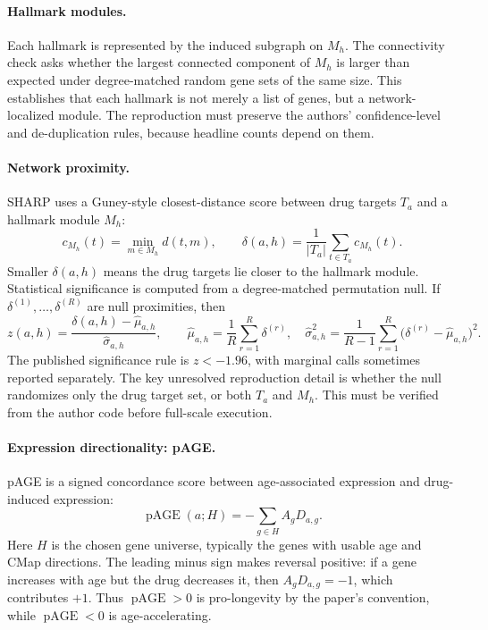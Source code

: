 \documentclass[11pt]{article}
\begin{document}
\paragraph{Hallmark modules.}
Each hallmark is represented by the induced subgraph on \(M_h\). The
connectivity check asks whether the largest connected component of \(M_h\) is
larger than expected under degree-matched random gene sets of the same size.
This establishes that each hallmark is not merely a list of genes, but a
network-localized module. The reproduction must preserve the authors'
confidence-level and de-duplication rules, because headline counts depend on
them.

\paragraph{Network proximity.}
SHARP uses a Guney-style closest-distance score between drug targets \(T_a\)
and a hallmark module \(M_h\):
\[
  c_{M_h}(t) = \min_{m \in M_h} d(t,m),
  \qquad
  \delta(a,h) = \frac{1}{|T_a|}\sum_{t \in T_a} c_{M_h}(t).
\]
Smaller \(\delta(a,h)\) means the drug targets lie closer to the hallmark
module. Statistical significance is computed from a degree-matched permutation
null. If \(\delta^{(1)},\ldots,\delta^{(R)}\) are null proximities, then
\[
  z(a,h)=
  \frac{\delta(a,h)-\widehat{\mu}_{a,h}}{\widehat{\sigma}_{a,h}},
  \qquad
  \widehat{\mu}_{a,h}=\frac{1}{R}\sum_{r=1}^R \delta^{(r)}, \quad
  \widehat{\sigma}_{a,h}^2=\frac{1}{R-1}\sum_{r=1}^R
  \bigl(\delta^{(r)}-\widehat{\mu}_{a,h}\bigr)^2.
\]
The published significance rule is \(z<-1.96\), with marginal calls sometimes
reported separately. The key unresolved reproduction detail is whether the null
randomizes only the drug target set, or both \(T_a\) and \(M_h\). This must be
verified from the author code before full-scale execution.

\paragraph{Expression directionality: pAGE.}
pAGE is a signed concordance score between age-associated expression and
drug-induced expression:
\[
  \operatorname{pAGE}(a;H)
  = -\sum_{g \in H} A_g D_{a,g}.
\]
Here \(H\) is the chosen gene universe, typically the genes with usable age and
CMap directions. The leading minus sign makes reversal positive: if a gene
increases with age but the drug decreases it, then \(A_gD_{a,g}=-1\), which
contributes \(+1\). Thus \(\operatorname{pAGE}>0\) is pro-longevity by the
paper's convention, while \(\operatorname{pAGE}<0\) is age-accelerating.
\end{document}
